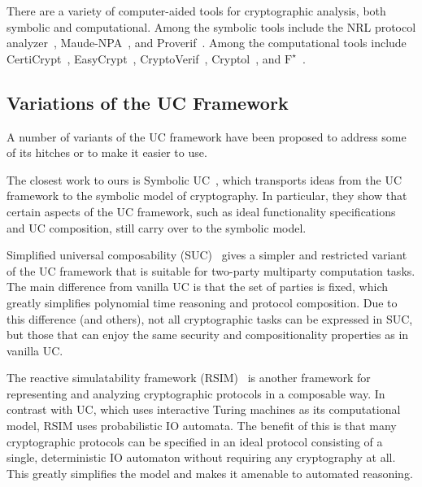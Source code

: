 There are a variety of computer-aided tools for cryptographic analysis, both
symbolic and computational. Among the symbolic tools include the NRL protocol
analyzer~\cite{meadows1996nrl}, Maude-NPA~\cite{escobar2009maude}, and
Proverif~\cite{blanchet2010proverif}. Among the computational tools include
CertiCrypt~\cite{barthe2009formal}, EasyCrypt~\cite{barthe2011computer},
CryptoVerif~\cite{blanchet2007cryptoverif}, Cryptol~\cite{lewis2003cryptol}, and
$\text{F}^{\star}$~\cite{swamy2016dependent}.


\subsection{Variations of the UC Framework}
\label{subsec:uc-variants}

A number of variants of the UC framework have been proposed to address some of
its hitches or to make it easier to use.

The closest work to ours is Symbolic UC~\cite{bohl2016symbolic}, which
transports ideas from the UC framework to the symbolic model of cryptography. In
particular, they show that certain aspects of the UC framework, such as ideal
functionality specifications and UC composition, still carry over to the
symbolic model.

Simplified universal composability (SUC)~\cite{canetti2015simpler} gives a
simpler and restricted variant of the UC framework that is suitable for
two-party multiparty computation tasks. The main difference from vanilla UC is
that the set of parties is fixed, which greatly simplifies polynomial time
reasoning and protocol composition. Due to this difference (and others), not all
cryptographic tasks can be expressed in SUC, but those that can enjoy the same
security and compositionality properties as in vanilla UC.

The reactive simulatability framework (RSIM)~\cite{backes2007reactive} is
another framework for representing and analyzing cryptographic protocols in a
composable way. In contrast with UC, which uses interactive Turing machines as
its computational model, RSIM uses probabilistic IO automata. The benefit of
this is that many cryptographic protocols can be specified in an ideal protocol
consisting of a single, deterministic IO automaton without requiring any
cryptography at all. This greatly simplifies the model and makes it amenable to
automated reasoning.


